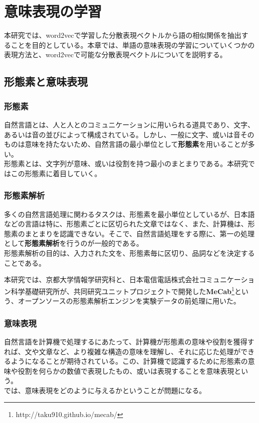 \chapter{意味表現の学習}
本研究では、word2vecで学習した分散表現ベクトルから語の相似関係を抽出することを目的としている。本章では、単語の意味表現の学習についていくつかの表現方法と、word2vecで可能な分散表現ベクトルについてを説明する。

\section{形態素と意味表現}
\subsection{形態素}
自然言語とは、人と人とのコミュニケーションに用いられる道具であり、文字、あるいは音の並びによって構成されている。しかし、一般に文字、或いは音そのものは意味を持たないため、自然言語の最小単位として\textbf{形態素}を用いることが多い。\\
形態素とは、文字列が意味、或いは役割を持つ最小のまとまりである。本研究ではこの形態素に着目していく。

\subsection{形態素解析}
多くの自然言語処理に関わるタスクは、形態素を最小単位としているが、日本語などの言語は特に、形態素ごとに区切られた文章ではなく、また、計算機は、形態素のまとまりを認識できない。そこで、自然言語処理をする際に、第一の処理として\textbf{形態素解析}を行うのが一般的である。\\
形態素解析の目的は、入力された文を、形態素毎に区切り、品詞などを決定することである。

本研究では、京都大学情報学研究科と、日本電信電話株式会社コミュニケーション科学基礎研究所が、共同研究ユニットプロジェクトで開発した\textbf{MeCab}\footnote{http://taku910.github.io/mecab/}\cite{mecab}という、オープンソースの形態素解析エンジンを実験データの前処理に用いた。

\subsection{意味表現}
自然言語を計算機で処理するにあたって、計算機が形態素の意味や役割を獲得すれば、文や文章など、より複雑な構造の意味を理解し、それに応じた処理ができるようになることが期待されている。この、計算機で認識するために形態素の意味や役割を何らかの数値で表現したもの、或いは表現することを意味表現という。\\
では、意味表現をどのように与えるかということが問題になる。

